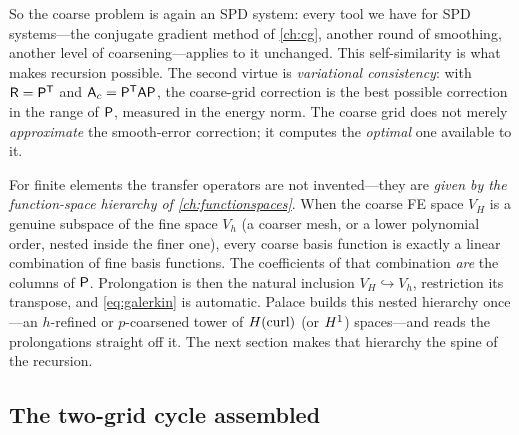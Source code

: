 So the coarse problem is again an SPD system: every tool we have for SPD systems---the
conjugate gradient method of \cref{ch:cg}, another round of smoothing, another level of
coarsening---applies to it unchanged. This self-similarity is what makes recursion
possible. The second virtue is \emph{variational consistency}: with $\mathsf{R} =
\mathsf{P}^{\mathsf T}$ and $\mathsf{A}_c=\mathsf{P}^{\mathsf T}\mathsf{A}\mathsf{P}$, the coarse-grid
correction is the best possible correction in the range of $\mathsf{P}$, measured in the
energy norm. The coarse grid does not merely \emph{approximate} the smooth-error
correction; it computes the \emph{optimal} one available to it.

\begin{physicsbox}
For finite elements the transfer operators are not invented---they are \emph{given by the
function-space hierarchy of \cref{ch:functionspaces}}. When the coarse FE space $V_H$ is a
genuine subspace of the fine space $V_h$ (a coarser mesh, or a lower polynomial order,
nested inside the finer one), every coarse basis function is exactly a linear combination
of fine basis functions. The coefficients of that combination \emph{are} the columns of
$\mathsf{P}$. Prolongation is then the natural inclusion $V_H \hookrightarrow V_h$, restriction
its transpose, and \cref{eq:galerkin} is automatic. Palace builds this nested hierarchy
once---an $h$-refined or $p$-coarsened tower of $H(\mathrm{curl})$ (or $H^1$) spaces---and reads
the prolongations straight off it. The next section makes that hierarchy the spine of the
recursion.
\end{physicsbox}

\subsection{The two-grid cycle assembled}

